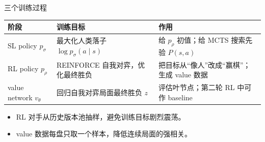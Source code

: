 \documentclass[UTF8,aspectratio=169,10pt]{ctexbeamer}
\begin{document}
\begin{frame}{三个训练过程}
  \begin{center}
    \begin{tabular}{p{}p{}p{}}
      \toprule
      阶段 & 训练目标 & 作用 \\
      \midrule
      SL policy $p_{\sigma}$ &
      最大化人类落子 $\log p_{\sigma}(a\mid s)$ &
      给 $p_{\rho}$ 初值；给 MCTS 搜索先验 $P(s,a)$ \\
      \midrule
      RL policy $p_{\rho}$ &
      REINFORCE 自我对弈，优化最终胜负 &
      把目标从“像人”改成“赢棋”；生成 value 数据 \\
      \midrule
      value network $v_{\theta}$ &
      回归自我对弈局面最终胜负 $z$ &
      评估叶节点；第二轮 RL 中可作 baseline \\
      \bottomrule
    \end{tabular}
  \end{center}

  \vspace{0.12cm}
  \begin{itemize}
    \item RL 对手从历史版本池抽样，避免训练目标剧烈震荡。
    \item value 数据每盘只取一个样本，降低连续局面的强相关。
  \end{itemize}
\end{frame}
\end{document}
